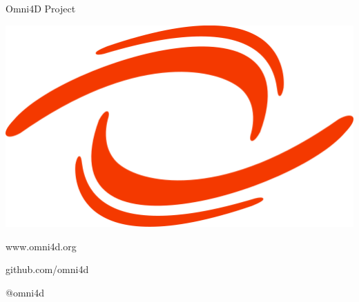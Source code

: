 
\blankscreen{
}

\begin{frame}{Omni4D Project}

  \includegraphics[scale=1.5]{images/omni4d}
  \begin{description}
    \item www.omni4d.org
    \item [Github] github.com/omni4d
    \item [Twitter] @omni4d
  \end{description}

\end{frame}
